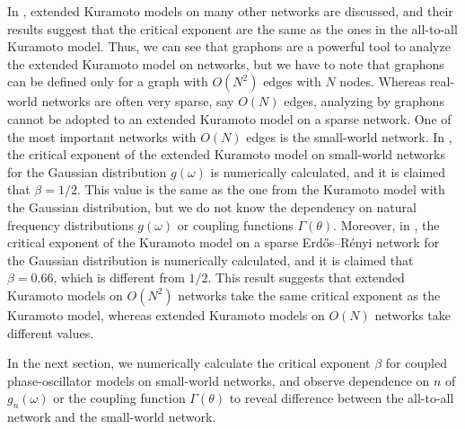 In \cite{chiba2018}, extended Kuramoto models on many other networks are discussed,
and their results suggest that the critical exponent are the same as the ones
in the all-to-all Kuramoto model.
Thus, we can see that graphons are a powerful tool to analyze the extended Kuramoto model on networks,
but we have to note that graphons can be defined only for a graph with $O(N^{2})$ edges
with $N$ nodes.
Whereas real-world networks are often very sparse, say $O(N)$ edges,
analyzing by graphons cannot be adopted to an extended Kuramoto model on a sparse network.
One of the most important networks with $O(N)$ edges is the small-world network.
In \cite{hong2002}, the critical exponent of the extended Kuramoto model on small-world networks
for the Gaussian distribution $g(\omega)$ is numerically calculated,
and it is claimed that $\beta=1/2$.
This value is the same as the one from the Kuramoto model with the Gaussian distribution,
but we do not know the dependency on natural frequency distributions $g(\omega)$
or coupling functions $\Gamma(\theta)$.
Moreover, in \cite{juhasz2019},
the critical exponent of the Kuramoto model on a sparse Erd\H{o}s--R\'{e}nyi network
for the Gaussian distribution is numerically calculated,
and it is claimed that $\beta=0.66$, which is different from $1/2$.
This result suggests that extended Kuramoto models on $O(N^{2})$ networks take the same critical exponent
as the Kuramoto model,
whereas extended Kuramoto models on $O(N)$ networks take different values.

In the next section,
we numerically calculate the critical exponent $\beta$ for coupled phase-oscillator models on small-world networks,
and observe dependence on $n$ of $g_{n}(\omega)$ or the coupling function $\Gamma(\theta)$
to reveal difference between the all-to-all network and the small-world network.
